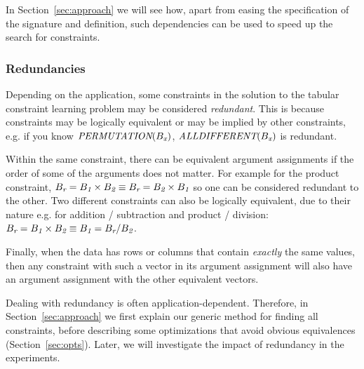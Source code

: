 In Section~\ref{sec:approach} we will see how, apart from easing the specification of the signature and definition, such dependencies can be used to speed up the search for constraints.

\subsubsection{Redundancies}
\label{sec:form:redundancies}
Depending on the application, some constraints in the solution to the tabular constraint learning problem may be considered \textit{redundant}. This is because constraints may be logically equivalent or may be implied by other constraints, e.g. if you know $\textit{PERMUTATION}(B_{\textit{x}})$, $\textit{ALLDIFFERENT}(B_{\textit{x}})$ is redundant.

Within the same constraint, there can be equivalent argument assignments if the order of some of the arguments does not matter. For example for the product constraint, $B_{\textit{r}} = B_{\textit{1}} \times B_{\textit{2}} \equiv B_{\textit{r}} = B_{\textit{2}} \times B_{\textit{1}}$ so one can be considered redundant to the other.
Two different constraints can also be logically equivalent, due to their nature e.g. for addition / subtraction and product / division: $B_{\textit{r}} = B_{\textit{1}} \times B_{\textit{2}} \equiv B_{\textit{1}} = {B_{\textit{r}}} / {B_{\textit{2}}}$.

Finally, when the data has rows or columns that contain \textit{exactly} the same values, then any constraint with such a vector in its argument assignment will also have an argument assignment with the other equivalent vectors.

Dealing with redundancy is often application-dependent.
Therefore, in Section~\ref{sec:approach} we first explain our generic method for finding all constraints, before describing some optimizations that avoid obvious equivalences (Section~\ref{sec:opts}).
Later, we will investigate the impact of redundancy in the experiments.

